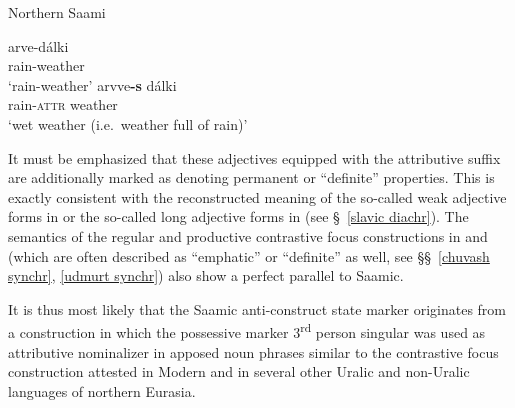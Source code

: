 {%
\begin{exe}
\ex
\begin{xlist}
\ex \rm{Northern Saami \citep[48]{bergsland1976}}
\begin{xlist}
\ex
\gll	arve-dálki\\
	rain-weather\\
\glt	‘rain-weather’
\ex
\gll	arvve\textbf{-s} dálki\\
	rain-\textsc{attr} weather\\
\glt	‘wet weather (i.e.~weather full of rain)’
\end{xlist}
\end{xlist}
\end{exe}
It must be emphasized that these adjectives equipped with the attributive suffix are additionally marked as denoting permanent or “definite” properties. This is exactly consistent with the reconstructed meaning of the so-called weak adjective forms in  or the so-called long adjective forms in  (see \S~\ref{slavic diachr}). The semantics of the regular and productive contrastive focus constructions in  and  (which are often described as “emphatic” or “definite” as well, see \S\S~\ref{chuvash synchr}, \ref{udmurt synchr}) also show a perfect parallel to Saamic.

It is thus most likely that the Saamic anti\hyp{}construct state marker originates from a construction in which the possessive marker 3\textsuperscript{rd} person singular was used as attributive nominalizer in apposed noun phrases similar to the contrastive focus construction attested in Modern  and in several other Uralic and non-Uralic languages of northern Eurasia.

}
